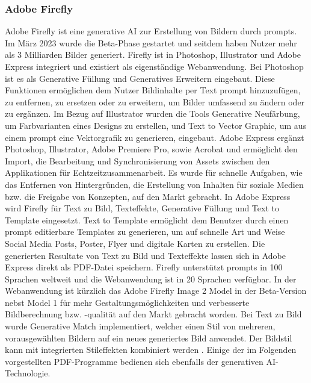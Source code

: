 \subsubsection{Adobe Firefly}
Adobe Firefly ist eine generative AI zur Erstellung von Bildern durch prompts. Im März 2023 wurde die Beta-Phase gestartet und seitdem haben Nutzer mehr als 3 Milliarden Bilder generiert. Firefly ist in Photoshop, Illustrator und Adobe Express integriert und existiert als eigenständige Webanwendung. Bei Photoshop ist es als Generative Füllung und Generatives Erweitern eingebaut. Diese Funktionen ermöglichen dem Nutzer Bildinhalte per Text prompt hinzuzufügen, zu entfernen, zu ersetzen oder zu erweitern, um Bilder umfassend zu ändern oder zu ergänzen. Im Bezug auf Illustrator wurden die Tools Generative Neufärbung, um Farbvarianten eines Designs zu erstellen, und Text to Vector Graphic, um aus einem prompt eine Vektorgrafik zu generieren, eingebaut. Adobe Express ergänzt Photoshop, Illustrator, Adobe Premiere Pro, sowie Acrobat und ermöglicht den Import, die Bearbeitung und Synchronisierung von Assets zwischen den Applikationen für Echtzeitzusammenarbeit. Es wurde für schnelle Aufgaben, wie das Entfernen von Hintergründen, die Erstellung von Inhalten für soziale Medien bzw. die Freigabe von Konzepten, auf den Markt gebracht. In Adobe Express wird Firefly für Text zu Bild, Texteffekte, Generative Füllung und Text to Template eingesetzt. Text to Template ermöglicht dem Benutzer durch einen prompt editierbare Templates zu generieren, um auf schnelle Art und Weise Social Media Posts, Poster, Flyer und digitale Karten zu erstellen. Die generierten Resultate von Text zu Bild und Texteffekte lassen sich in Adobe Express direkt als PDF-Datei speichern. Firefly unterstützt prompts in 100 Sprachen weltweit und die Webanwendung ist in 20 Sprachen verfügbar. In der Webanwendung ist kürzlich das Adobe Firefly Image 2 Model in der Beta-Version nebst Model 1 für mehr Gestaltungsmöglichkeiten und verbesserte Bildberechnung bzw. -qualität auf den Markt gebracht worden. Bei Text zu Bild wurde Generative Match implementiert, welcher einen Stil von mehreren, vorausgewählten Bildern auf ein neues generiertes Bild anwendet. Der Bildstil kann mit integrierten Stileffekten kombiniert werden \cite{adobe-firefly}. Einige der im Folgenden vorgestellten PDF-Programme bedienen sich ebenfalls der generativen AI-Technologie.